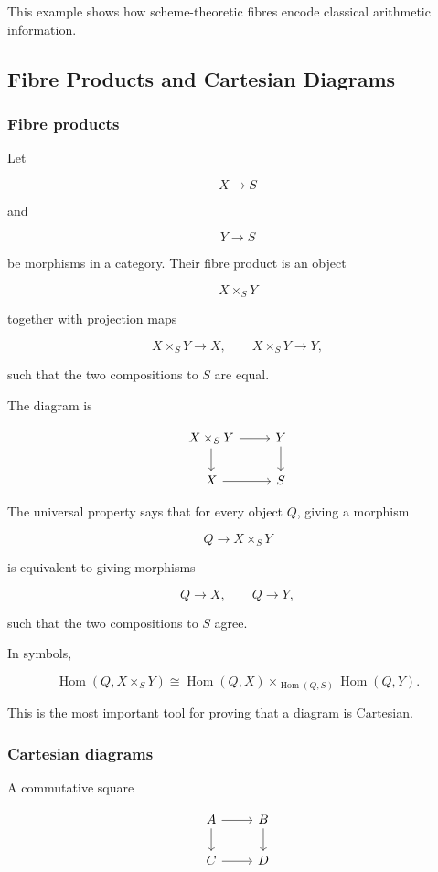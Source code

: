 \documentclass[12pt,a4paper]{article}
\theoremstyle{notespace}
\begin{document}
This example shows how scheme-theoretic fibres encode classical arithmetic information.

\subsection{Fibre Products and Cartesian Diagrams}

\subsubsection{Fibre products}

Let

\[
X\to S
\]

and

\[
Y\to S
\]

be morphisms in a category. Their fibre product is an object

\[
X\times_S Y
\]

together with projection maps

\[
X\times_S Y\to X,
\qquad
X\times_S Y\to Y,
\]

such that the two compositions to \(S\) are equal.

The diagram is

\[
\begin{tikzcd}
	X\times_S Y \arrow[r] \arrow[d] & Y \arrow[d] \\
	X \arrow[r] & S
\end{tikzcd}
\]

The universal property says that for every object \(Q\), giving a morphism

\[
Q\to X\times_S Y
\]

is equivalent to giving morphisms

\[
Q\to X,
\qquad
Q\to Y,
\]

such that the two compositions to \(S\) agree.

In symbols,

\[
\operatorname{Hom}(Q,X\times_S Y)
\cong
\operatorname{Hom}(Q,X)
\times_{\operatorname{Hom}(Q,S)}
\operatorname{Hom}(Q,Y).
\]

This is the most important tool for proving that a diagram is Cartesian.

\subsubsection{Cartesian diagrams}

A commutative square

\[
\begin{tikzcd}
	A \arrow[r] \arrow[d] & B \arrow[d] \\
	C \arrow[r] & D
\end{tikzcd}
\]
\end{document}
